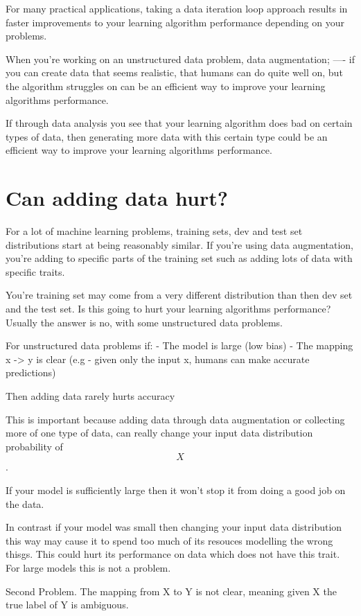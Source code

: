 For many practical applications, taking a data iteration loop approach results in faster improvements to your learning algorithm performance depending on your problems.

When you're working on an unstructured data problem, data augmentation; ---- if you can create data that seems realistic, that humans can do quite well on, but the algorithm struggles on can be an efficient way to improve your learning algorithms performance.

If through data analysis you see that your learning algorithm does bad on certain types of data, then generating more data with this certain type could be an efficient way to improve your learning algorithms performance.

\section{Can adding data hurt?}

For a lot of machine learning problems, training sets, dev and test set distributions start at being reasonably similar.
If you're using data augmentation, you're adding to specific parts of the training set such as adding lots of data with specific traits.

You're training set may come from a very different distribution than then dev set and the test set.
Is this going to hurt your learning algorithms performance?
Usually the answer is no, with some unstructured data problems.

For unstructured data problems if:
- The model is large (low bias)
- The mapping x -> y is clear (e.g - given only the input x, humans can make accurate predictions)

Then adding data rarely hurts accuracy

This is important because adding data through data augmentation or collecting more of one type of data, can really change your input data distribution probability of $$X$$.

If your model is sufficiently large then it won't stop it from doing a good job on the data.

In contrast if your model was small then changing your input data distribution this way may cause it to spend too much of its resouces modelling the wrong thisgs.
This could hurt its performance on data which does not have this trait.
For large models this is not a problem.

Second Problem.
The mapping from X to Y is not clear, meaning given X the true label of Y is ambiguous.

